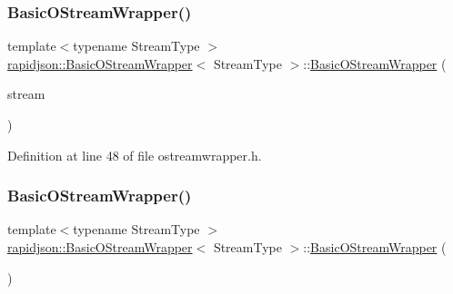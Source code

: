 \subsubsection{\texorpdfstring{BasicOStreamWrapper()}{BasicOStreamWrapper()}\hspace{0.1cm}{\footnotesize\ttfamily [1/2]}}
{\footnotesize\ttfamily template$<$typename Stream\+Type $>$ \\
\mbox{\hyperlink{classrapidjson_1_1_basic_o_stream_wrapper}{rapidjson\+::\+Basic\+O\+Stream\+Wrapper}}$<$ Stream\+Type $>$\+::\mbox{\hyperlink{classrapidjson_1_1_basic_o_stream_wrapper}{Basic\+O\+Stream\+Wrapper}} (\begin{DoxyParamCaption}\item[{Stream\+Type \&}]{stream }\end{DoxyParamCaption})}



Definition at line 48 of file ostreamwrapper.\+h.


\begin{DoxyCode}{0}

\end{DoxyCode}
\mbox{\label{classrapidjson_1_1_basic_o_stream_wrapper_a9a5759c12a6496917b1776dade393730}} 
\subsubsection{\texorpdfstring{BasicOStreamWrapper()}{BasicOStreamWrapper()}\hspace{0.1cm}{\footnotesize\ttfamily [2/2]}}
{\footnotesize\ttfamily template$<$typename Stream\+Type $>$ \\
\mbox{\hyperlink{classrapidjson_1_1_basic_o_stream_wrapper}{rapidjson\+::\+Basic\+O\+Stream\+Wrapper}}$<$ Stream\+Type $>$\+::\mbox{\hyperlink{classrapidjson_1_1_basic_o_stream_wrapper}{Basic\+O\+Stream\+Wrapper}} (\begin{DoxyParamCaption}\item[{const \mbox{\hyperlink{classrapidjson_1_1_basic_o_stream_wrapper}{Basic\+O\+Stream\+Wrapper}}$<$ Stream\+Type $>$ \&}]{ }\end{DoxyParamCaption})\hspace{0.3cm}{\ttfamily [private]}}



